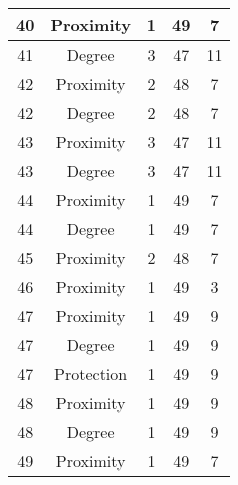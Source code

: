 \documentclass[results.tex]{subfiles}
\begin{document}
\begin{center}
\begin{tabular}{| c || c | c | c | c |}
    40 & Proximity & 1 & 49 & 7 \\ 
    \hline
    41 & Degree & 3 & 47 & 11 \\ 
    \hline
    42 & Proximity & 2 & 48 & 7 \\ 
    \hline
    42 & Degree & 2 & 48 & 7 \\ 
    \hline
    43 & Proximity & 3 & 47 & 11 \\ 
    \hline
    43 & Degree & 3 & 47 & 11 \\ 
    \hline
    44 & Proximity & 1 & 49 & 7 \\ 
    \hline
    44 & Degree & 1 & 49 & 7 \\ 
    \hline
    45 & Proximity & 2 & 48 & 7 \\ 
    \hline
    46 & Proximity & 1 & 49 & 3 \\ 
    \hline
    47 & Proximity & 1 & 49 & 9 \\ 
    \hline
    47 & Degree & 1 & 49 & 9 \\ 
    \hline
    47 & Protection & 1 & 49 & 9 \\ 
    \hline
    48 & Proximity & 1 & 49 & 9 \\ 
    \hline
    48 & Degree & 1 & 49 & 9 \\ 
    \hline
    49 & Proximity & 1 & 49 & 7 \\ 
    \hline   \end{tabular}
\end{center}
\end{document}
